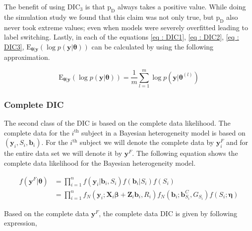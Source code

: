 The benefit of using $\text{DIC}_3$ is that $\text{p}_\text{D}$ always takes a positive value. While doing the simulation study we found that this claim was not only true, but $\text{p}_\text{D}$ also never took extreme values; even when models were severely overfitted leading to label switching. Lastly, in each of the equations \ref{eq : DIC1}, \ref{eq : DIC2}, \ref{eq : DIC3},  $\text{E}_{\boldsymbol{\theta}|\boldsymbol{y}}(\log{p(\boldsymbol{y}|\boldsymbol{\theta})}) $ can be calculated by using the following approximation.

\begin{equation}
\label{eq : mean_posterior_deviance_approx}
\text{E}_{\boldsymbol{\theta}|\boldsymbol{y}}(\log{p(\boldsymbol{y}|\boldsymbol{\theta})})  = \frac 1 m \sum_{l=1}^m\log{p(\boldsymbol{y}|\boldsymbol{\theta}^{(l)})}
\end{equation}

\subsubsection{Complete DIC}
The second class of the DIC is based on the complete data likelihood. The complete data for the $i^\text{th}$ subject in a Bayesian heterogeneity model is based on $(\boldsymbol{y}_i, S_i, \boldsymbol{b}_i)$. For the $i^\text{th}$ subject we will denote the complete data by $\boldsymbol{y}_i^F$ and for the entire data set we will denote it by $\boldsymbol{y}^F$. The following equation shows the complete data likelihood for the Bayesian heterogeneity model.

\begin{equation}
\label{eq : complete_data_likelihood}
\begin{split}
f(\boldsymbol{y}^F | \boldsymbol{\theta}) & = \prod_{i=1}^n f(\boldsymbol{y}_i|\boldsymbol{b}_i, S_i) f(\boldsymbol{b}_i|S_i) f(S_i)\\
& = \prod_{i=1}^n f_N(\boldsymbol{y}_i; \boldsymbol{X}_i\boldsymbol{\beta} + \boldsymbol{Z}_i \boldsymbol{b}_i, R_i) f_N(\boldsymbol{b}_i; \boldsymbol{b}_{S_i}^C, G_{S_i}) f(S_i; \boldsymbol{\eta})
\end{split}
\end{equation}

Based on the complete data $\boldsymbol{y}^F$, the complete data DIC is given by following expression,

